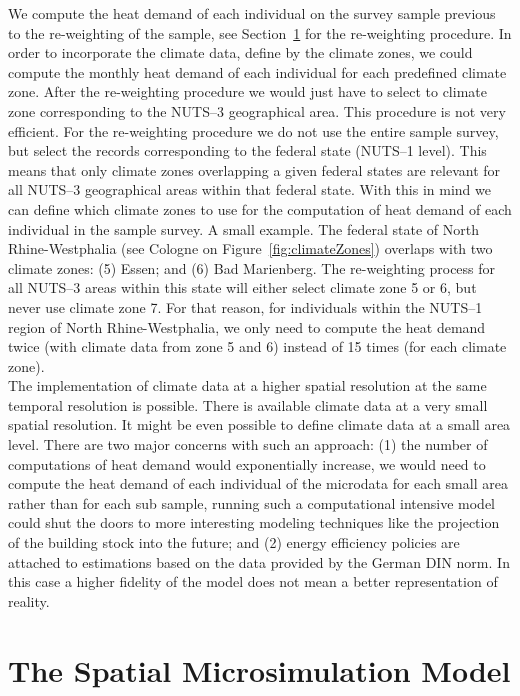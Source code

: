 \documentclass[runningheads,a4paper]{llncs}
\begin{document}
We compute the heat demand of each individual on the survey sample previous to
the re-weighting of the sample, see Section~\ref{sec:microsim} for the
re-weighting procedure.
In order to incorporate the climate data, define by the climate zones, we could
compute the monthly heat demand of each individual for each predefined climate
zone.
After the re-weighting procedure we would just have to select to climate zone
corresponding to the NUTS--3 geographical area.
This procedure is not very efficient.
For the re-weighting procedure we do not use the entire sample survey, but
select the records corresponding to the federal state (NUTS--1 level).
This means that only climate zones overlapping a given federal states are
relevant for all NUTS--3 geographical areas within that federal state.
With this in mind we can define which climate zones to use for the computation
of heat demand of each individual in the sample survey.
A small example.
The federal state of North Rhine-Westphalia (see Cologne on
Figure~\ref{fig:climateZones}) overlaps with two climate zones:
(5) Essen; and (6) Bad Marienberg.
The re-weighting process for all NUTS--3 areas within this state will either
select climate zone 5 or 6, but never use climate zone 7.
For that reason, for individuals within the NUTS--1 region of North
Rhine-Westphalia,
we only need to compute the heat demand twice (with climate data from zone 5
and 6) instead of 15 times (for each climate zone).
\\

The implementation of climate data at a higher spatial resolution at the same
temporal resolution is possible. There is available climate data at a very
small spatial resolution. It might be even possible to define climate
data at a small area level. There are two major concerns with such an approach:
(1) the number of computations of heat demand would exponentially increase,
we would need to compute the heat demand of each individual of the microdata
for each small area rather than for each sub sample,
running such a computational intensive model could shut the doors to more
interesting modeling techniques like the projection of the building stock into
the future; and (2) energy efficiency policies are attached to estimations
based on the data provided by the German DIN norm.
In this case a higher fidelity of the model does not mean a better
representation of reality.
\\

\section{The Spatial Microsimulation Model}\label{sec:microsim}
\end{document}
